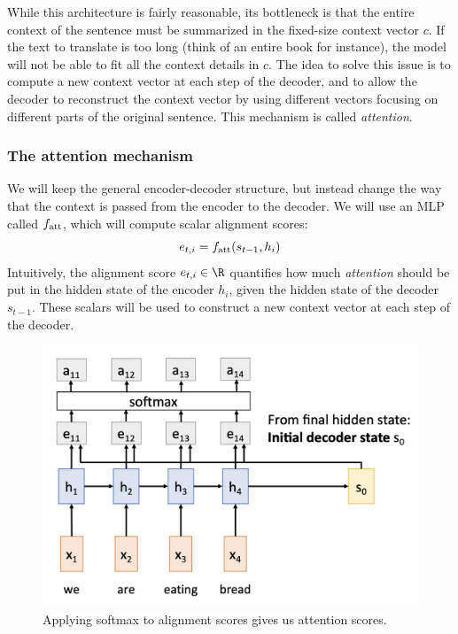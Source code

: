 While this architecture is fairly reasonable, its bottleneck is that the entire context of the sentence must be summarized in the fixed-size context vector $c$. If the text to translate is too long (think of an entire book for instance), the model will not be able to fit all the context details in $c$. The idea to solve this issue is to compute a new context vector at each step of the decoder, and to allow the decoder to reconstruct the context vector by using different vectors focusing on different parts of the original sentence. This mechanism is called \emph{attention}.

\subsubsection{The attention mechanism}
We will keep the general encoder-decoder structure, but instead change the way that the context is passed from the encoder to the decoder. We will use an MLP called $f_{\textnormal{att}}$, which will compute scalar alignment scores:
\begin{equation*}
    e_{t,i} = f_{\textnormal{att}}(s_{t-1}, h_i)
\end{equation*}
Intuitively, the alignment score $e_{t,i}\in\R$ quantifies how much \emph{attention} should be put in the hidden state of the encoder $h_i$, given the hidden state of the decoder $s_{t-1}$. These scalars will be used to construct a new context vector at each step of the decoder.

\begin{figure}[H]
    \centering
    \includegraphics[width=.5\textwidth]{images/attention-scores.png}
    \caption{Applying softmax to alignment scores gives us attention scores.}
\end{figure}

